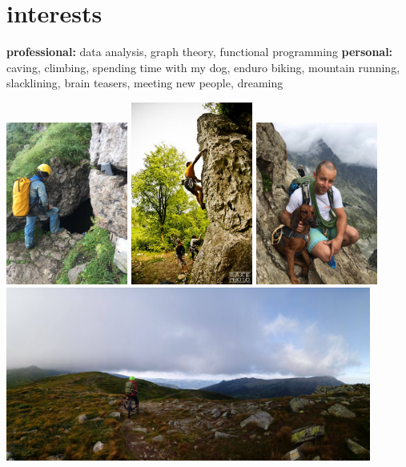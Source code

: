 \documentclass[]{friggeri-cv}
\begin{document}
\section{interests}
{\textbf{professional:} data analysis, graph theory, functional programming \textbf{personal:} caving, climbing, spending time with my dog, enduro biking, mountain running, slacklining, brain teasers, meeting new people, dreaming}

\begin{center}
\includegraphics[width=0.3\textwidth]{foto1}
\includegraphics[width=0.3\textwidth]{foto4}
\includegraphics[width=0.3\textwidth]{foto}
\includegraphics[width=0.9\textwidth]{foto3}
\end{center}
\end{document}
